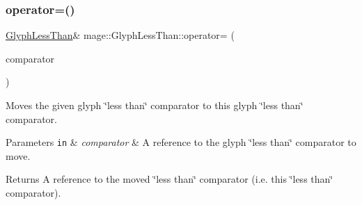 \subsubsection{\texorpdfstring{operator=()}{operator=()}\hspace{0.1cm}{\footnotesize\ttfamily [2/2]}}
{\footnotesize\ttfamily \hyperlink{structmage_1_1_glyph_less_than}{Glyph\+Less\+Than}\& mage\+::\+Glyph\+Less\+Than\+::operator= (\begin{DoxyParamCaption}\item[{\hyperlink{structmage_1_1_glyph_less_than}{Glyph\+Less\+Than} \&\&}]{comparator }\end{DoxyParamCaption})\hspace{0.3cm}{\ttfamily [default]}}

Moves the given glyph \char`\"{}less than\char`\"{} comparator to this glyph \char`\"{}less than\char`\"{} comparator.


\begin{DoxyParams}[1]{Parameters}
\mbox{\tt in}  & {\em comparator} & A reference to the glyph \char`\"{}less than\char`\"{} comparator to move. \\
\hline
\end{DoxyParams}
\begin{DoxyReturn}{Returns}
A reference to the moved \char`\"{}less than\char`\"{} comparator (i.\+e. this \char`\"{}less than\char`\"{} comparator). 
\end{DoxyReturn}
